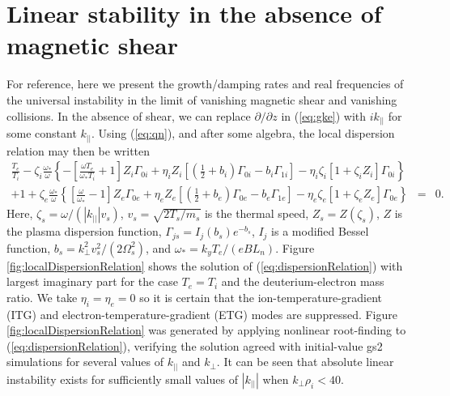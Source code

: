 \documentclass[12pt,superscriptaddress]{revtex4}
\newcommand{\omegase}{\omega_{*}}
\begin{document}
\appendix

\section{Linear stability in the absence of magnetic shear}
\label{appendix:zeroShear}

For reference, here we present the growth/damping rates and real frequencies of the
universal instability in the limit of vanishing
magnetic shear and vanishing collisions.
In the absence of shear, we can replace $\partial/\partial z$ in (\ref{eq:gke})
with $i k_{||}$ for some constant $k_{||}$.
Using (\ref{eq:qn}), and after some algebra, the local dispersion relation may then be written
\begin{eqnarray}
\frac{T_e}{T_i}-\zeta_i\frac{\omegase}{\omega}\left\{
-\left[\frac{\omega T_e}{\omegase T_i}+1\right]Z_i \Gamma_{0i}
+\eta_i Z_i \left[ \left(\frac{1}{2}+b_i\right) \Gamma_{0i}-b_i \Gamma_{1i}\right]
-\eta_i \zeta_i \left[1+\zeta_i Z_i\right] \Gamma_{0i}\right\}
&&\label{eq:dispersionRelation} \\
+
1+\zeta_e\frac{\omegase}{\omega}\left\{
\left[\frac{\omega}{\omegase}-1\right]Z_e \Gamma_{0e}
+\eta_e Z_e \left[ \left(\frac{1}{2}+b_e\right) \Gamma_{0e}-b_e \Gamma_{1e}\right]
-\eta_e \zeta_e \left[1+\zeta_e Z_e\right] \Gamma_{0e}\right\}
&=&0.
\nonumber
\end{eqnarray}
Here, $\zeta_s = \omega/(\left| k_{||} \right| v_s)$, $v_s = \sqrt{2 T_s/m_s}$ is the thermal speed, $Z_s = Z(\zeta_s)$, $Z$ is the plasma dispersion function,
$\Gamma_{js} = I_j(b_s)e^{-b_s}$, $I_j$ is a modified Bessel function, $b_s = k_{\perp}^2 v_s^2/(2 \Omega_s^2)$,
and $\omega_* = k_y T_e/(e B L_n)$.
Figure \ref{fig:localDispersionRelation} shows the solution of (\ref{eq:dispersionRelation})
with largest imaginary part for the case $T_e = T_i$
and the deuterium-electron mass ratio.
We take $\eta_i = \eta_e = 0$
so it is certain that the ion-temperature-gradient (ITG) and electron-temperature-gradient (ETG)
modes are suppressed.
Figure \ref{fig:localDispersionRelation} was generated by applying nonlinear root-finding to (\ref{eq:dispersionRelation}),
verifying the solution agreed with initial-value gs2 simulations for several values of $k_{||}$ and $k_{\perp}$.
It can be seen that absolute linear instability exists for sufficiently small values of $\left|k_{||}\right|$
when $k_{\perp} \rho_i < 40$.
\end{document}
